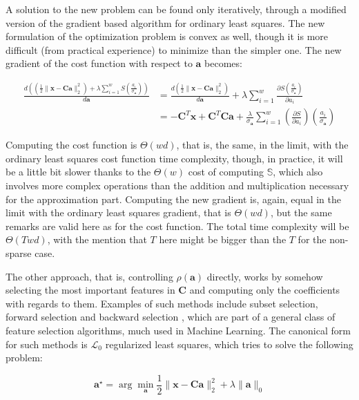 \documentclass[12pt,a4paper,oneside,english]{UPBThesis}
\begin{document}
A solution to the new problem can be found only iteratively, through a modified version of the gradient based algorithm for ordinary least squares. The new formulation of the optimization problem is convex as well, though it is more difficult (from practical experience) to minimize than the simpler one. The new gradient of the cost function with respect to $\textbf{a}$ becomes:

\begin{align*}
\frac{d \left( \left( \frac{1}{2}\|\textbf{x} - \textbf{C}\textbf{a}\|_2^2 \right) + \lambda\sum_{i=1}^{w}{S(\frac{a_i}{\sigma_{\textbf{a}}})} \right)}{d\textbf{a}} & = \frac{d \left( \frac{1}{2}\|\textbf{x} - \textbf{C}\textbf{a}\|_2^2 \right)}{d\textbf{a}} + \lambda\sum_{i=1}^{w}\frac{\partial S(\frac{a_i}{\sigma_{\textbf{a}}})}{\partial a_i} \\
& = -\textbf{C}^T\textbf{x} + \textbf{C}^T\textbf{C}\textbf{a} + \frac{\lambda}{\sigma_{\textbf{a}}} \sum_{i=1}^{w} {\left( \frac{\partial S}{\partial a_i} \right) \left( \frac{a_i}{\sigma_{\textbf{a}}} \right)}
\end{align*}

Computing the cost function is $\Theta(wd)$, that is, the same, in the limit, with the ordinary least squares cost function time complexity, though, in practice, it will be a little bit slower thanks to the $\Theta(w)$ cost of computing $\mathbb{S}$, which also involves more complex operations than the addition and multiplication necessary for the approximation part. Computing the new gradient is, again, equal in the limit with the ordinary least squares gradient, that is $\Theta(wd)$, but the same remarks are valid here as for the cost function. The total time complexity will be $\Theta(Twd)$, with the mention that $T$ here might be bigger than the $T$ for the non-sparse case.

The other approach, that is, controlling $\rho(\textbf{a})$ directly, works by somehow selecting the most important features in $\textbf{C}$ and computing only the coefficients with regards to them. Examples of such methods include subset selection, forward selection and backward selection \cite{elements-statistical-learning}, which are part of a general class of feature selection algorithms, much used in Machine Learning. The canonical form for such methods is $\mathcal{L}_0$ regularized least squares, which tries to solve the following problem:

\begin{equation*}
\textbf{a}^{\star} = \arg\min_{\textbf{a}} \frac{1}{2} \| \textbf{x} - \textbf{C}\textbf{a} \|_2^2 + \lambda \| \textbf{a} \|_0
\end{equation*}
\end{document}

